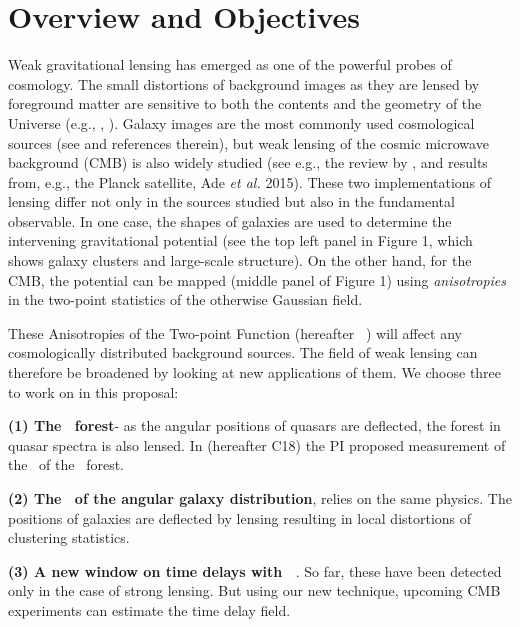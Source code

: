 \section{Overview and Objectives}
Weak gravitational lensing has emerged as one of the powerful probes
of cosmology. The small distortions of background images as
they are lensed by foreground matter are sensitive to both the
contents and the geometry of the Universe (e.g., \cite{blandford92},
\cite{hoekstra2008}).  Galaxy images are the most commonly used
cosmological sources (see \cite{Kilbinger2015} and references
therein), but weak lensing of the cosmic microwave background (CMB) is
also widely studied (see e.g., the review by \cite{lewis2006}, and
results from, e.g., the Planck satellite, Ade {\it et al.} 2015).
 These two implementations of lensing differ not only 
in the sources 
studied  but also in
the fundamental observable. In one case,
 the shapes of galaxies are used to
determine the intervening gravitational potential (see the top
left panel in Figure 1, which shows galaxy clusters and large-scale structure).
On the other hand, for the
CMB, the potential can be mapped (middle panel of Figure 1) using
{\it anisotropies} in the
two-point statistics of the otherwise Gaussian field. 


These Anisotropies of the Two-point Function (hereafter \atf\ ) will 
affect any cosmologically distributed background
sources. The field of weak lensing can therefore be broadened by looking 
at new applications of them. We choose three to work  on in this proposal:

{\bf(1) The \lya\ forest}- as the angular 
positions of quasars are deflected, the forest 
in quasar spectra is also lensed.
In \cite{croft17} (hereafter C18)
 the PI proposed measurement of the 
\atf\ of the \lya\ forest.


 {\bf (2) The \atf\ 
of the angular galaxy distribution},
relies on the same physics. The positions
of galaxies are deflected by lensing
resulting in local distortions of
clustering statistics.

{\bf (3) A new window on time delays with \atf\ }. So far, these have been
detected only in the case of strong lensing. But using our new
technique,  upcoming CMB experiments can estimate the time
delay field.



\vspace{-0.1cm}


